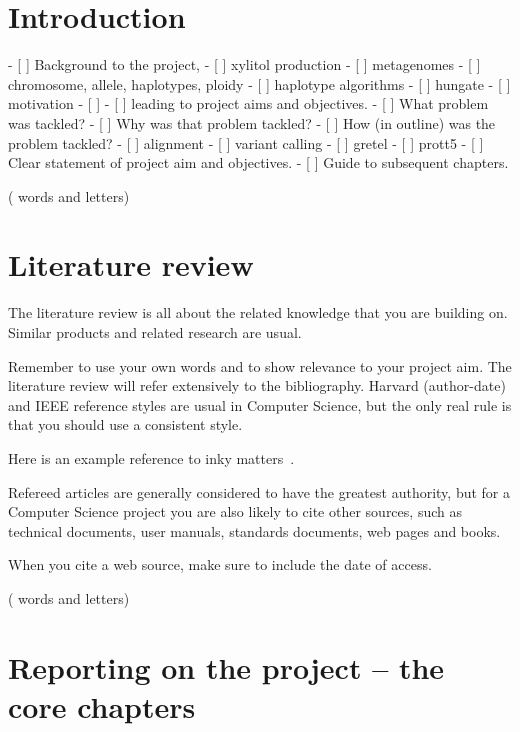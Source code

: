 \documentclass{main}
\newcounter{wordcount}
\newcounter{lettercount}
\begin{document}
\chapter{Introduction}

\countem

- [ ] Background to the project,
- [ ] xylitol production
- [ ] metagenomes
- [ ] chromosome, allele, haplotypes, ploidy
- [ ] haplotype algorithms
- [ ] hungate
- [ ] motivation
- [ ]
- [ ] leading to project aims and objectives.
- [ ] What problem was tackled?
- [ ] Why was that problem tackled?
- [ ] How (in outline) was the problem tackled?
- [ ] alignment
- [ ] variant calling
- [ ] gretel
- [ ] prott5
- [ ] Clear statement of project aim and objectives.
- [ ] Guide to subsequent chapters.

\endcountem
(\thewordcount{} words and \thelettercount{} letters)

\chapter{Literature review}

\countem

The literature review is all about the related knowledge that you are building on.  Similar products and related research are usual.

Remember to use your own words and to show relevance to your project aim.
The literature review will refer extensively to the bibliography.  Harvard (author-date) and IEEE reference styles are usual in Computer Science, but the only real rule is that you should use a consistent style.

Here is an example reference to inky matters~\cite{Jones2010}.

Refereed articles are generally considered to have the greatest authority, but for a Computer Science project you are also likely to cite other sources, such as technical documents, user manuals, standards documents, web pages and books.

When you cite a web source, make sure to include the date of access.

\endcountem
(\thewordcount{} words and \thelettercount{} letters)

\chapter{Reporting on the project -- the core chapters}
\end{document}

